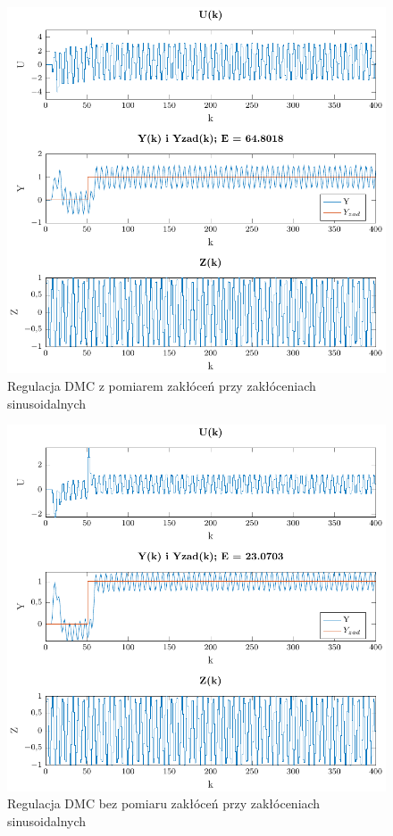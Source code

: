 \documentclass[a4paper,titlepage,11pt,twosides,floatssmall]{mwrep}
\begin{document}
\begin{figure}[H]
	\centering
	\includegraphics[scale=0.85]{../../Lab2/PDF_rysunki/Z6_DMCSinZOdsprz.pdf}
	\caption{Regulacja DMC z pomiarem zakłóceń przy zakłóceniach sinusoidalnych}
	\label{sin_z_pom}
\end{figure}


\begin{figure}[H]
	\centering
	\includegraphics[scale=0.85]{../../Lab2/PDF_rysunki/Z6_DMCSinBezOdsprz.pdf}
	\caption{Regulacja DMC bez pomiaru zakłóceń przy zakłóceniach sinusoidalnych}
	\label{sin_bez_pom}
\end{figure}
\end{document}
